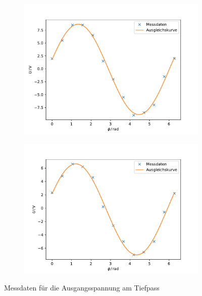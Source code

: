 \begin{figure}[h]
\begin{subfigure}{0.45\textwidth}
    \centering
    \includegraphics[width=\textwidth]{assets/plot_1.pdf}
\end{subfigure}
\begin{subfigure}{0.45\textwidth}
    \centering
    \includegraphics[width=\textwidth]{assets/plot_2.pdf}
\end{subfigure}
\caption{Messdaten für die Ausgangsspannung am Tiefpass}
\label{fig:tiefpass}
\end{figure}

